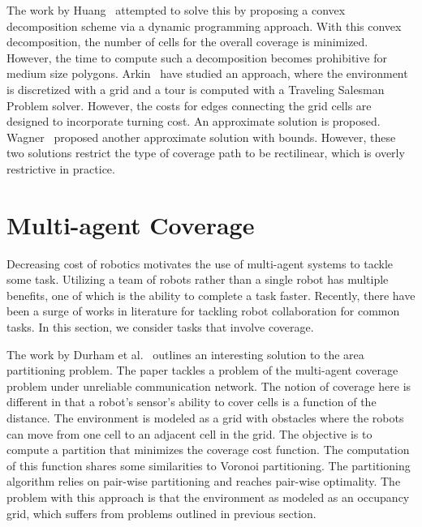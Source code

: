 \documentclass[../main.tex]{subfiles}
\begin{document}
The work by Huang~\cite{Huang2001optimal} attempted to solve this by proposing a convex decomposition scheme via a dynamic programming approach. With this convex decomposition, the number of cells for the overall coverage is minimized. However, the time to compute such a decomposition becomes prohibitive for medium size polygons. Arkin~\cite{arkin2005optimal} have studied an approach, where the environment is discretized with a grid and a tour is computed with a Traveling Salesman Problem solver. However, the costs for edges connecting the grid cells are designed to incorporate turning cost. An approximate solution is proposed. Wagner~\cite{wagner2001approximation} proposed another approximate solution with bounds. However, these two solutions restrict the type of coverage path to be rectilinear, which is overly restrictive in practice.


\section{Multi-agent Coverage}
\label{section:multi_agent_coverage_lit_review}

Decreasing cost of robotics motivates the use of multi-agent systems to tackle some task. Utilizing a team of robots rather than a single robot has multiple benefits, one of which is the ability to complete a task faster. Recently, there have been a surge of works in literature for tackling robot collaboration for common tasks. In this section, we consider tasks that involve coverage.

The work by Durham et al.~\cite{durham2012discrete} outlines an interesting solution to the area partitioning problem. The paper tackles a problem of the multi-agent coverage problem under unreliable communication network. The notion of coverage here is different in that a robot's sensor's ability to cover cells is a function of the distance. The environment is modeled as a grid with obstacles where the robots can move from one cell to an adjacent cell in the grid. The objective is to compute a partition that minimizes the coverage cost function. The computation of this function shares some similarities to Voronoi partitioning. The partitioning algorithm relies on pair-wise partitioning and reaches pair-wise optimality. The problem with this approach is that the environment as modeled as an occupancy grid, which suffers from problems outlined in previous section. 
\end{document}
